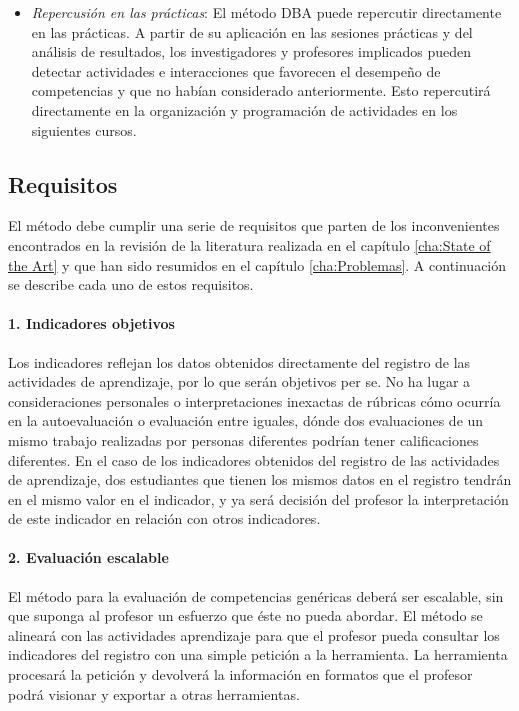 \begin{itemize}
\item \emph{Repercusión en las prácticas}: El método DBA puede repercutir directamente en las prácticas. A partir de su aplicación en las sesiones prácticas y del análisis de resultados, los investigadores y profesores implicados pueden detectar actividades e interacciones que favorecen el desempeño de competencias y que no habían considerado anteriormente. Esto repercutirá directamente en la organización y programación de actividades en los siguientes cursos.
\end{itemize}

\subsection{Requisitos}

El método debe cumplir una serie de requisitos que parten de los inconvenientes encontrados en la revisión de la literatura realizada en el capítulo \ref{cha:State of the Art} y que han sido resumidos en el capítulo \ref{cha:Problemas}. A continuación se describe cada uno de estos requisitos.

\paragraph*{1. Indicadores objetivos}

Los indicadores reflejan los datos obtenidos directamente del registro de las actividades de aprendizaje, por lo que serán objetivos per se. No ha lugar a consideraciones personales o interpretaciones inexactas de rúbricas cómo ocurría en la autoevaluación o evaluación entre iguales, dónde dos evaluaciones de un mismo trabajo realizadas por personas diferentes podrían tener calificaciones diferentes. En el caso de los indicadores obtenidos del registro de las actividades de aprendizaje, dos estudiantes que tienen los mismos datos en el registro tendrán en el mismo valor en el indicador, y ya será decisión del profesor la interpretación de este indicador en relación con otros indicadores.

\paragraph*{2. Evaluación escalable}

El método para la evaluación de competencias genéricas deberá ser escalable, sin que suponga al profesor un esfuerzo que éste no pueda abordar. El método se alineará con las actividades aprendizaje para que el profesor pueda consultar los indicadores del registro con una simple petición a la herramienta. La herramienta procesará la petición y devolverá la información en formatos que el profesor podrá visionar y exportar a otras herramientas.


